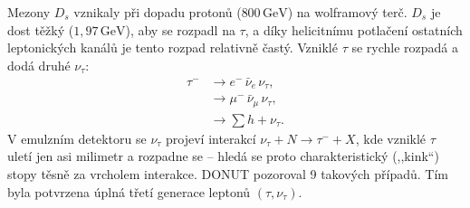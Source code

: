 Mezony \(D_s\) vznikaly při dopadu protonů (\(800\,\mathrm{GeV}\)) na wolframový terč. \(D_s\) je dost těžký
(\(1{,}97\,\mathrm{GeV}\)), aby se rozpadl na \(\tau\), a díky helicitnímu potlačení ostatních
leptonických kanálů je tento rozpad relativně častý. Vzniklé \(\tau\) se rychle rozpadá a dodá
druhé \(\nu_\tau\):
\begin{align*}
  \tau^- &\to e^-\,\bar\nu_e\,\nu_\tau ,\\
         &\to \mu^-\,\bar\nu_\mu\,\nu_\tau ,\\
         &\to \textstyle\sum h + \nu_\tau .
\end{align*}
V emulzním detektoru se \(\nu_\tau\) projeví interakcí \(\nu_\tau + N\to\tau^- + X\), kde
vzniklé \(\tau\) uletí jen asi milimetr a rozpadne se -- hledá se proto charakteristický
 (,,kink``) stopy těsně za vrcholem interakce. DONUT pozoroval 9 takových případů.
Tím byla potvrzena úplná třetí generace leptonů \((\tau,\nu_\tau)\).
